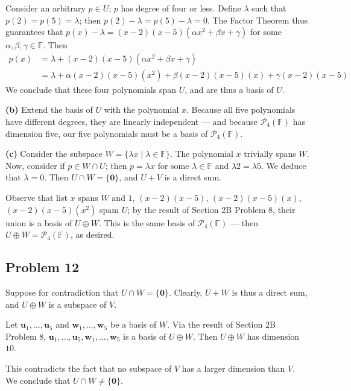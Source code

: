 \documentclass[11pt]{article}
\renewcommand{\vec}[1]{\mathbf{#1}}
\begin{document}
Consider an arbitrary $p \in U$; $p$ has degree of four or less. Define $\lambda$ such that $p(2) = p(5) = \lambda$; then $p(2) - \lambda = p(5) - \lambda = 0$. The Factor Theorem thus guarantees that $p(x) - \lambda = (x-2)(x-5)(\alpha x^{2} + \beta x + \gamma)$ for some $\alpha, \beta, \gamma \in \mathbb{F}$. Then
\begin{align*}
	p(x) &= \lambda + (x-2)(x-5)(\alpha x^{2} + \beta x + \gamma) \\ 
	&= \lambda + \alpha(x-2)(x-5)(x^{2}) + \beta(x-2)(x-5)(x) + \gamma(x-2)(x-5)
\end{align*}
We conclude that these four polynomials span $U$, and are thus a basis of $U$.

\textbf{(b)} Extend the basis of $U$ with the polynomial $x$. Because all five polynomials have different degrees, they are linearly independent --- and because $\mathcal{P}_{4}(\mathbb{F})$ has dimension five, our five polynomials must be a basis of $\mathcal{P}_{4}(\mathbb{F})$.

\textbf{(c)} Consider the subspace $W = \{ \lambda x \mid \lambda \in \mathbb{F} \}$. The polynomial $x$ trivially spans $W$. Now, consider if $p \in W \cap U$; then $p = \lambda x$ for some $\lambda \in \mathbb{F}$ and $\lambda 2 = \lambda 5$. We deduce that $\lambda = 0$. Then $U \cap W = \{ \vec{0} \}$, and $U + V$ is a direct sum.

Observe that list $x$ spans $W$ and $1$, $(x-2)(x-5)$, $(x-2)(x-5)(x)$, $(x-2)(x-5)(x^{2})$ spam $U$; by the result of Section 2B Problem 8, their union is a basis of $U \oplus W$. This is the same basis of $\mathcal{P}_{4}(\mathbb{F})$ --- then $U \oplus W = \mathcal{P}_{4}(\mathbb{F})$, as desired.


\subsection{Problem 12}

Suppose for contradiction that $U \cap W = \{ \vec{0} \}$. Clearly, $U + W$ is thus a direct sum, and $U \oplus W$ is a subspace of $V$.

Let $\vec{u}_{1}, \ldots, \vec{u}_{5}$ and $\vec{w}_{1}, \ldots, \vec{w}_{5}$ be a basis of $W$. Via the result of Section 2B Problem 8, $\vec{u}_{1}, \ldots, \vec{u}_{5}, \vec{w}_{1}, \ldots, \vec{w}_{5}$ is a basis of $U \oplus W$. Then $U \oplus W$ has dimension $10$.

This contradicts the fact that no subspace of $V$ has a larger dimension than $V$. We conclude that $U \cap W \ne \{ \vec{0} \}$.
\end{document}
